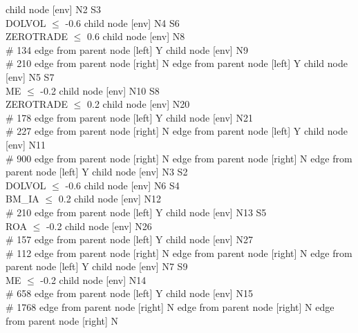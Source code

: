 
      child { node [env] {N2  S3 \\ DOLVOL $\leq$ -0.6} 
            child { node [env] {N4  S6 \\ ZEROTRADE $\leq$ 0.6} 
                  child { node [env] {N8   \\ \# 134 } 
                        edge from parent node [left] {Y} 
                  }
                  child { node [env] {N9   \\ \# 210 } 
                        edge from parent node [right] {N} 
                  }
                  edge from parent node [left] {Y} 
            }
            child { node [env] {N5  S7 \\ ME $\leq$ -0.2} 
                  child { node [env] {N10  S8 \\ ZEROTRADE $\leq$ 0.2} 
                        child { node [env] {N20   \\ \# 178 } 
                              edge from parent node [left] {Y} 
                        }
                        child { node [env] {N21   \\ \# 227 } 
                              edge from parent node [right] {N} 
                        }
                        edge from parent node [left] {Y} 
                  }
                  child { node [env] {N11   \\ \# 900 } 
                        edge from parent node [right] {N} 
                  }
                  edge from parent node [right] {N} 
            }
            edge from parent node [left] {Y} 
      }
      child { node [env] {N3  S2 \\ DOLVOL $\leq$ -0.6} 
            child { node [env] {N6  S4 \\ BM\_IA $\leq$ 0.2} 
                  child { node [env] {N12   \\ \# 210 } 
                        edge from parent node [left] {Y} 
                  }
                  child { node [env] {N13  S5 \\ ROA $\leq$ -0.2} 
                        child { node [env] {N26   \\ \# 157 } 
                              edge from parent node [left] {Y} 
                        }
                        child { node [env] {N27   \\ \# 112 } 
                              edge from parent node [right] {N} 
                        }
                        edge from parent node [right] {N} 
                  }
                  edge from parent node [left] {Y} 
            }
            child { node [env] {N7  S9 \\ ME $\leq$ -0.2} 
                  child { node [env] {N14   \\ \# 658 } 
                        edge from parent node [left] {Y} 
                  }
                  child { node [env] {N15   \\ \# 1768 } 
                        edge from parent node [right] {N} 
                  }
                  edge from parent node [right] {N} 
            }
            edge from parent node [right] {N} 
      }

